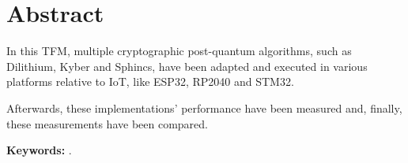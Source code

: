 %
%
%
% 
%
%
%
%

\chapter*{Abstract}\label{cha:abstract}




In this TFM, multiple cryptographic post-quantum algorithms, such as Dilithium, Kyber and Sphincs, have been adapted and executed in various platforms relative to IoT, like ESP32, RP2040 and STM32.

Afterwards, these implementations' performance have been measured and, finally, these measurements have been compared.

\textbf{Keywords:} \myThesisKeywordsEnglish.



